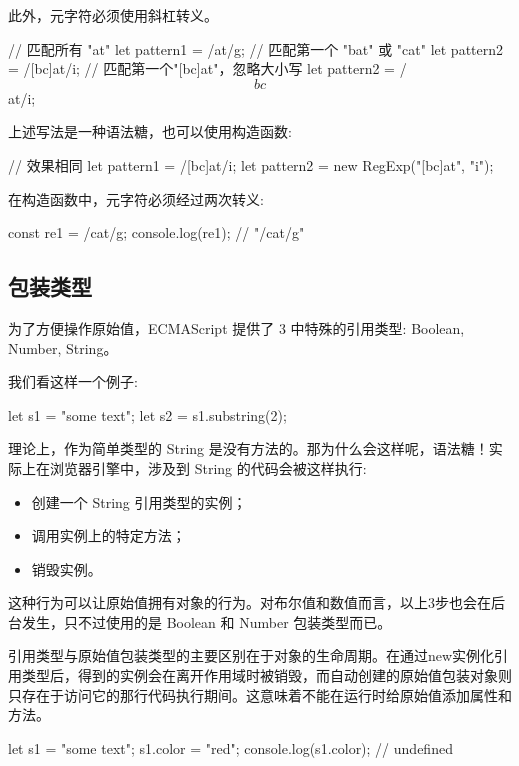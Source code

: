 此外，元字符必须使用斜杠转义。

\begin{JavaScript}
// 匹配所有 "at"
let pattern1 = /at/g;
// 匹配第一个 "bat" 或 "cat"
let pattern2 = /[bc]at/i;
// 匹配第一个"[bc]at"，忽略大小写
let pattern2 = /\[bc\]at/i; 
\end{JavaScript}

上述写法是一种语法糖，也可以使用构造函数:

\begin{JavaScript}
// 效果相同
let pattern1 = /[bc]at/i; 
let pattern2 = new RegExp("[bc]at", "i");
\end{JavaScript}

在构造函数中，元字符必须经过两次转义:

\begin{JavaScript}
const re1 = /cat/g; 
console.log(re1);  // "/cat/g" 
\end{JavaScript}

\subsection{包装类型}

为了方便操作原始值，ECMAScript 提供了 3 中特殊的引用类型: Boolean, Number, String。

我们看这样一个例子:
\begin{JavaScript}
let s1 = "some text";
let s2 = s1.substring(2);
\end{JavaScript}

理论上，作为简单类型的 String 是没有方法的。那为什么会这样呢，语法糖！实际上在浏览器引擎中，涉及到 String 的代码会被这样执行:
\begin{itemize}
    \item 创建一个 String 引用类型的实例；
    \item 调用实例上的特定方法；
    \item 销毁实例。
\end{itemize}

这种行为可以让原始值拥有对象的行为。对布尔值和数值而言，以上3步也会在后台发生，只不过使用的是 Boolean 和 Number 包装类型而已。

引用类型与原始值包装类型的主要区别在于对象的生命周期。在通过new实例化引用类型后，得到的实例会在离开作用域时被销毁，而自动创建的原始值包装对象则只存在于访问它的那行代码执行期间。这意味着不能在运行时给原始值添加属性和方法。

\begin{JavaScript}
let s1 = "some text"; 
s1.color = "red"; 
console.log(s1.color);  // undefined 
\end{JavaScript}

